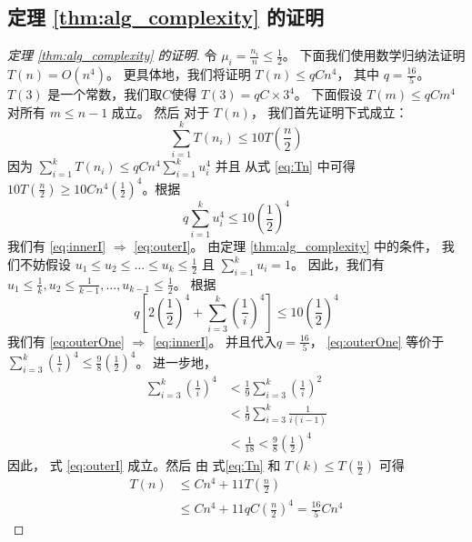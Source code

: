 \subsection{定理 \ref{thm:alg_complexity} 的证明}
\begin{proof}[定理 \ref{thm:alg_complexity} 的证明]
  令
  $\mu_i = \frac{n_i}{n} \leq \frac{1}{2}$。
  下面我们使用数学归纳法证明
  $T(n) = O(n^4)$。
  更具体地，我们将证明 
  $T(n) \leq q C n^4$， 其中 $ q = \frac{16}{5}$。
  $T(3)$ 是一个常数，我们取$C$使得 $T(3)= q C\times 3^4$。
  下面假设
	$T(m) \leq qC m^4$
  对所有 $m \leq n-1$ 成立。
  然后 对于 $T(n)$，
	我们首先证明下式成立：
	\begin{equation}\label{eq:outerI}
	\sum_{i=1}^k T(n_i) \leq 10 T\left(\frac{n}{2}\right)
	\end{equation}
	因为 $\sum_{i=1}^k T(n_i) \leq qC n^4\sum_{i=1}^k u_i^4$ 并且
  从式 \eqref{eq:Tn} 中可得
  $10 T\left(\frac{n}{2}\right) \geq 10Cn^4 
  \left(\frac{1}{2}\right)^4$。根据
	\begin{equation}\label{eq:innerI}
       q\sum_{i=1}^k u_i^4 \leq 10 \left(\frac{1}{2}\right)^4 
	\end{equation}
	我们有 \eqref{eq:innerI} $\Rightarrow$ \eqref{eq:outerI}。
  由定理 \ref{thm:alg_complexity} 中的条件，
  我们不妨假设
  $u_1\leq u_2 \leq \dots \leq u_k \leq \frac{1}{2}$
  且 $\sum_{i=1}^k u_i = 1$。
  因此，我们有
  $u_1 \leq \frac{1}{k}, u_2 \leq \frac{1}{k-1}, \dots, u_{k-1} \leq \frac{1}{2}$。
	根据
  \begin{equation}\label{eq:outerOne}
	 q \left[2 \left(\frac{1}{2}\right)^4 + \sum_{i=3}^k \left(\frac{1}{i}\right)^4\right]
   \leq 10  \left(\frac{1}{2}\right)^4
	\end{equation}
	我们有 \eqref{eq:outerOne} $\Rightarrow$ \eqref{eq:innerI}。
  并且代入$q=\frac{16}{5}$，
  \eqref{eq:outerOne} 等价于
	$\sum_{i=3}^k \left(\frac{1}{i} \right)^4 \leq \frac{9}{8}\left(\frac{1}{2}\right)^4$。
  进一步地，
	\begin{align*}
		\sum_{i=3}^k \left(\frac{1}{i} \right)^4 & < \frac{1}{9}\sum_{i=3}^k \left(\frac{1}{i}
    \right)^2 \\
		& < \frac{1}{9}\sum_{i=3}^k \frac{1}{i(i-1)} \\
		& < \frac{1}{18}
    < \frac{9}{8}\left(\frac{1}{2}
    \right)^4
	\end{align*}
	因此，
  式 \eqref{eq:outerI} 成立。然后
  由 式\eqref{eq:Tn} 和 $T(k) \leq T\left(\frac{n}{2}\right)$ 可得
	\begin{align}
		T(n)  & \leq Cn^4 + 11T\left(\frac{n}{2} \right) \\
		& \leq C n^4 + 11 q C \left(\frac{n}{2}\right)^4
    = \frac{16}{5} C n^4
	\end{align}
\end{proof}

